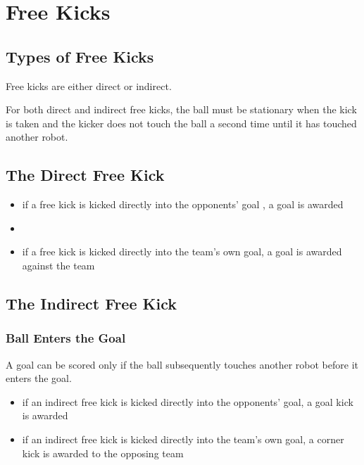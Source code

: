 \section{Free Kicks}\label{sec:free-kicks}

\subsection{Types of Free Kicks}
Free kicks are either direct or indirect.

For both direct and indirect free kicks, the ball must be stationary when the kick is taken and the kicker does not touch the ball a second time until it has touched another robot.

\subsection{The Direct Free Kick}
\begin{itemize}
\item if a free kick is kicked directly into the opponents' goal , a goal is awarded
\item {}
\item if a free kick is kicked directly into the team's own goal, a goal is awarded against the team
\end{itemize}

\subsection{The Indirect Free Kick}
\subsubsection{Ball Enters the Goal}
A goal can be scored only if the ball subsequently touches another robot before it enters the goal.

\begin{itemize}
\item if an indirect free kick is kicked directly into the opponents' goal, a goal kick is awarded
\item if an indirect free kick is kicked directly into the team's own goal, a corner kick is awarded to the opposing team
\end{itemize}

